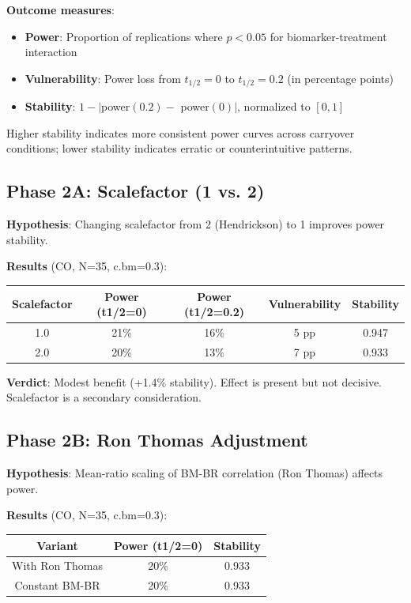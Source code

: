 \documentclass[12pt,a4paper]{article}
\begin{document}
\textbf{Outcome measures}:
\begin{itemize}
\item \textbf{Power}: Proportion of replications where $p < 0.05$ for biomarker-treatment interaction
\item \textbf{Vulnerability}: Power loss from $t_{1/2}=0$ to $t_{1/2}=0.2$ (in percentage points)
\item \textbf{Stability}: $1 - |$power$(0.2) -$ power$(0)|$, normalized to $[0,1]$
\end{itemize}

Higher stability indicates more consistent power curves across carryover conditions; lower stability indicates erratic or counterintuitive patterns.

\subsection{Phase 2A: Scalefactor (1 vs. 2)}

\textbf{Hypothesis}: Changing scalefactor from 2 (Hendrickson) to 1 improves power stability.

\textbf{Results} (CO, N=35, c.bm=0.3):

\begin{center}
\begin{tabular}{ccccc}
\toprule
\textbf{Scalefactor} & \textbf{Power (t1/2=0)} & \textbf{Power (t1/2=0.2)} & \textbf{Vulnerability} & \textbf{Stability} \\
\midrule
1.0 & 21\% & 16\% & 5 pp & 0.947 \\
2.0 & 20\% & 13\% & 7 pp & 0.933 \\
\bottomrule
\end{tabular}
\end{center}

\textbf{Verdict}: Modest benefit (+1.4\% stability). Effect is present but not decisive. Scalefactor is a secondary consideration.

\subsection{Phase 2B: Ron Thomas Adjustment}

\textbf{Hypothesis}: Mean-ratio scaling of BM-BR correlation (Ron Thomas) affects power.

\textbf{Results} (CO, N=35, c.bm=0.3):

\begin{center}
\begin{tabular}{ccc}
\toprule
\textbf{Variant} & \textbf{Power (t1/2=0)} & \textbf{Stability} \\
\midrule
With Ron Thomas & 20\% & 0.933 \\
Constant BM-BR & 20\% & 0.933 \\
\bottomrule
\end{tabular}
\end{center}
\end{document}
